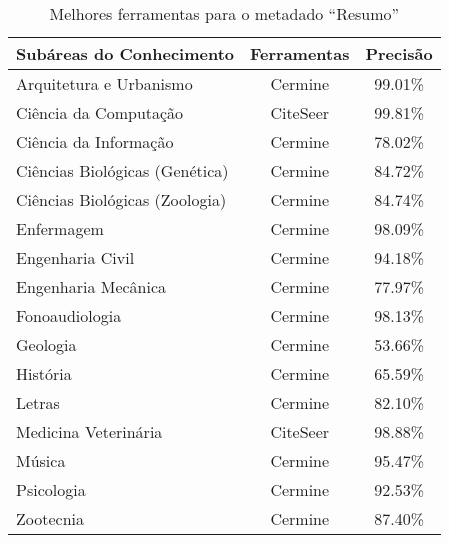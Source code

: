 \begin{table}
    \caption{Melhores ferramentas para o metadado ``Resumo''}
    \begin{center}
        \begin{tabular}{|l|c|c|}
            \hline 
            \textbf{Subáreas do Conhecimento} & \textbf{Ferramentas} & \textbf{Precisão} \\ 
            \hline 
            Arquitetura e Urbanismo & Cermine & 99.01\% \\ \hline
            Ciência da Computação & CiteSeer & 99.81\% \\ \hline
            Ciência da Informação & Cermine & 78.02\% \\ \hline
            Ciências Biológicas (Genética) & Cermine & 84.72\% \\ \hline
            Ciências Biológicas (Zoologia) & Cermine & 84.74\% \\ \hline
            Enfermagem & Cermine & 98.09\% \\ \hline
            Engenharia Civil & Cermine & 94.18\% \\ \hline
            Engenharia Mecânica & Cermine & 77.97\% \\ \hline
            Fonoaudiologia & Cermine & 98.13\% \\ \hline
            Geologia & Cermine & 53.66\% \\ \hline
            História & Cermine & 65.59\% \\ \hline
            Letras & Cermine & 82.10\% \\ \hline
            Medicina Veterinária & CiteSeer & 98.88\% \\ \hline
            Música & Cermine & 95.47\% \\ \hline
            Psicologia & Cermine & 92.53\% \\ \hline
            Zootecnia & Cermine & 87.40\% \\ \hline
        \end{tabular}
    \end{center}
    \label{tab:areas-abstract-tools}
\end{table}

